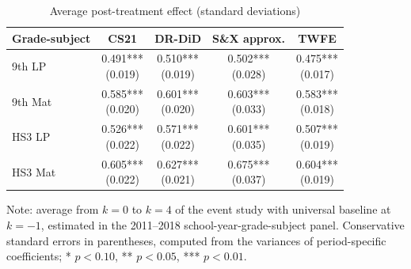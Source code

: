 ﻿\begin{table}[htbp]
\centering
\caption{Average post-treatment effect (standard deviations)}
\label{tab:eventstudy_principal}
\begin{tabular}{lcccc}
\toprule
Grade-subject & CS21 & DR-DiD & S\&X approx. & TWFE \\
\midrule
9th LP & \makecell{0.491***\\(0.019)} & \makecell{0.510***\\(0.019)} & \makecell{0.502***\\(0.028)} & \makecell{0.475***\\(0.017)} \\
9th Mat & \makecell{0.585***\\(0.020)} & \makecell{0.601***\\(0.020)} & \makecell{0.603***\\(0.033)} & \makecell{0.583***\\(0.018)} \\
HS3 LP & \makecell{0.526***\\(0.022)} & \makecell{0.571***\\(0.022)} & \makecell{0.601***\\(0.035)} & \makecell{0.507***\\(0.019)} \\
HS3 Mat & \makecell{0.605***\\(0.022)} & \makecell{0.627***\\(0.021)} & \makecell{0.675***\\(0.037)} & \makecell{0.604***\\(0.019)} \\
\bottomrule
\end{tabular}
\vspace{0.2cm}
\begin{flushleft}
\footnotesize Note: average from \(k=0\) to \(k=4\) of the event study with universal baseline at \(k=-1\), estimated in the 2011--2018 school-year-grade-subject panel. Conservative standard errors in parentheses, computed from the variances of period-specific coefficients; * \(p<0.10\), ** \(p<0.05\), *** \(p<0.01\).
\end{flushleft}
\end{table}



